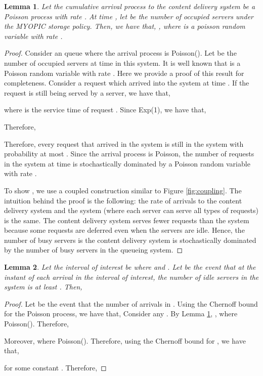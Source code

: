 \documentclass[10pt, conference, letterpaper]{IEEEtran}
\newtheorem{lemma}{Lemma}
\begin{document}
\begin{lemma}
	\label{lemma:occupancy}
	Let the cumulative arrival process to the content delivery system be a Poisson process with rate . At time , let  be the number of occupied servers under the MYOPIC storage policy. Then, we have that, , where  is a poisson random variable with rate .
\end{lemma}
\begin{proof}
	Consider an  queue where the arrival process is Poisson(). Let  be the number of occupied servers at time  in this system. It is well known that  is a Poisson random variable with rate . Here we provide a proof of this result for completeness. Consider a request  which arrived into the system at time . If the request is still being served by a server, we have that,
	
	where  is the service time of request . Since  Exp(1), we have that,
	
	Therefore,
	
	Therefore, every request that arrived in the system is still in the system with probability at most . Since the arrival process is Poisson, the number of requests in the system at time  is stochastically dominated by a Poisson random variable with rate .
	
	To show , we use a coupled construction similar to Figure \ref{fig:coupling}. The intuition behind the proof is the following: the rate of arrivals to the content delivery system and the  system (where each server can serve all types of requests) is the same. The content delivery system serves fewer requests than the  system because some requests are deferred even when the servers are idle. Hence, the number of busy servers is the content delivery system is stochastically dominated by the number of busy servers in the  queueing system.
\end{proof}


\begin{lemma}
	\label{lemma:F_1}
	Let the interval of interest be  where  and . Let  be the event that at the instant of each arrival in the interval of interest, the number of idle servers in the system is at least . Then,
	
\end{lemma}
\begin{proof}
	Let  be the event that the number of arrivals in . Using the Chernoff bound for the  Poisson process, we have that, 
	Consider any . By Lemma \ref{lemma:occupancy}, , where  Poisson(). Therefore,
	
	Moreover,  where  Poisson(). Therefore, using the Chernoff bound for , we have that,
	
	for some constant . Therefore,
	
\end{proof}
\end{document}

